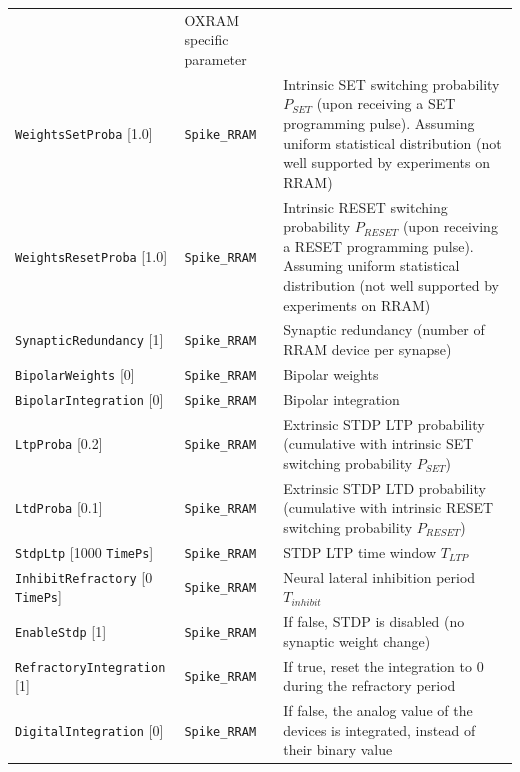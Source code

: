 \documentclass[a4paper,11pt,oneside]{article}
\begin{document}
\begin{center}
\begin{longtable}{| p{4cm} | p{3cm} | p{9cm} | }
  & OXRAM specific parameter \\
  \lstinline!WeightsSetProba! [1.0] & \lstinline!Spike_RRAM!
  & Intrinsic SET switching probability $P_{SET}$ (upon receiving a SET
   programming pulse). Assuming uniform statistical distribution (not well
   supported by experiments on RRAM) \\
  \lstinline!WeightsResetProba! [1.0] & \lstinline!Spike_RRAM!
  & Intrinsic RESET switching probability $P_{RESET}$ (upon receiving a RESET
  programming pulse). Assuming uniform statistical distribution (not well
  supported by experiments on RRAM) \\
  \lstinline!SynapticRedundancy! [1] & \lstinline!Spike_RRAM!
  & Synaptic redundancy (number of RRAM device per synapse) \\
  \cellcolor{expercolor}\lstinline!BipolarWeights! [0] & \lstinline!Spike_RRAM!
  & Bipolar weights \\
  \cellcolor{expercolor}\lstinline!BipolarIntegration! [0]
  & \lstinline!Spike_RRAM! & Bipolar integration \\
  \cellcolor{expercolor}\lstinline!LtpProba! [0.2] & \lstinline!Spike_RRAM!
  & Extrinsic STDP LTP probability (cumulative with intrinsic SET switching
  probability $P_{SET}$) \\
  \cellcolor{expercolor}\lstinline!LtdProba! [0.1] & \lstinline!Spike_RRAM!
  & Extrinsic STDP LTD probability (cumulative with intrinsic RESET switching
   probability $P_{RESET}$) \\
  \cellcolor{expercolor}\lstinline!StdpLtp! [1000 \lstinline!TimePs!] & \lstinline!Spike_RRAM! & STDP LTP time window $T_{LTP}$ \\
  \cellcolor{expercolor}\lstinline!InhibitRefractory! [0 \lstinline!TimePs!] & \lstinline!Spike_RRAM! & Neural lateral inhibition period $T_{inhibit}$ \\
  \cellcolor{expercolor}\lstinline!EnableStdp! [1] & \lstinline!Spike_RRAM!
  & If false, STDP is disabled (no synaptic weight change) \\
  \cellcolor{expercolor}\lstinline!RefractoryIntegration! [1]
   & \lstinline!Spike_RRAM! & If true, reset the integration to 0 during
   the refractory period \\
  \cellcolor{expercolor}\lstinline!DigitalIntegration! [0]
  & \lstinline!Spike_RRAM! & If false, the analog value of the devices is
  integrated, instead of their binary value \\
 \hline
\end{longtable}
\end{center}
\end{document}
